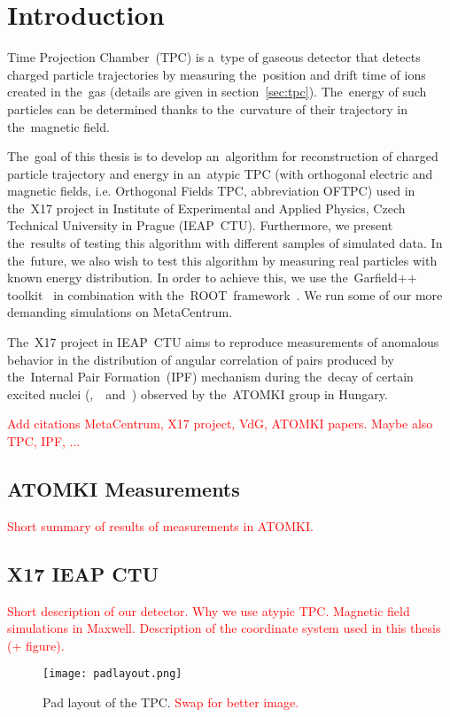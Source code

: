 \chapter*{Introduction}
	Time Projection Chamber~(TPC) is a~type of gaseous detector that detects charged particle trajectories by measuring the~position and drift time of ions created in the~gas (details are given in section~\ref{sec:tpc}). The~energy of such particles can be determined thanks to the~curvature of their trajectory in the~magnetic field.
	
	The~goal of this thesis is to develop an~algorithm for reconstruction of charged particle trajectory and energy in an~atypic TPC (with orthogonal electric and magnetic fields, i.e. Orthogonal Fields TPC, abbreviation OFTPC) used in the~X17 project in Institute of Experimental and Applied Physics, Czech Technical University in Prague (IEAP~CTU). Furthermore, we present the~results of testing this algorithm with different samples of simulated data. In the~future, we also wish to test this algorithm by measuring real particles with known energy distribution. In order to achieve this, we use the~Garfield++ toolkit~\cite{Garfield++} in combination with the~ROOT~framework~\cite{ROOT}. We run some of our more demanding simulations on MetaCentrum.
	
	The~X17 project in IEAP~CTU aims to reproduce measurements of anomalous behavior in the distribution of angular correlation of pairs produced by the~Internal Pair Formation~(IPF) mechanism during the~decay of certain excited nuclei (,~~and~) observed by the~ATOMKI group in Hungary. 
	
	\textcolor{red}{Add citations MetaCentrum, X17 project, VdG, ATOMKI papers. Maybe also TPC, IPF, ...}
	
	\section{ATOMKI Measurements}
	\textcolor{red}{Short summary of results of measurements in ATOMKI.}
	
	\section{X17 IEAP CTU}
	\label{sec:IEAP}
	\textcolor{red}{Short description of our detector. Why we use atypic TPC. Magnetic field simulations in Maxwell. Description of the coordinate system used in this thesis (+ figure).}
	
	\begin{figure}
		\centering
		\texttt{[image: padlayout.png]}
		\caption{Pad layout of the TPC. \textcolor{red}{Swap for better image.}}
		\label{fig:padlayout}
	\end{figure}